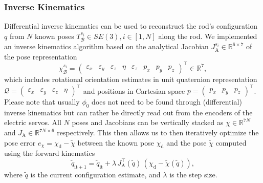 \subsubsection{Inverse Kinematics}\label{ssub:hsamodel:hsa_rod_kinematics:inverse_kinematics}
Differential inverse kinematics can be used to reconstruct the rod's configuration $q$ from $N$ known poses $T_{\mathcal{B}}^{s_i} \in SE(3), i \in [1, N]$ along the rod. 
We implemented an inverse kinematics algorithm based on the analytical Jacobian $J_\mathrm{A}^{s_i} \in \mathbb{R}^{6 \times 7}$ of the pose representation
\begin{equation*}
    \chi_{\mathcal{B}}^{s_i} = \begin{pmatrix}
        \varepsilon_x & \varepsilon_y & \varepsilon_z & \eta & \varepsilon_z & p_x & p_y & p_z
    \end{pmatrix}^\top \in \mathbb{R}^{7},
\end{equation*}
which includes rotational orientation estimates in unit quaternion representation $\mathcal{Q} = \begin{pmatrix} \varepsilon_x & \varepsilon_y & \varepsilon_z & \eta \end{pmatrix}^\top$ and positions in Cartesian space $p = \begin{pmatrix} p_x & p_y & p_z \end{pmatrix}^\top$.
Please note that usually $\phi_0$ does not need to be found through (differential) inverse kinematics but can rather be directly read out from the encoders of the electric servos.
All $N$ poses and Jacobians can be vertically stacked as $\chi \in \mathbb{R}^{7N}$  and $J_\mathrm{A} \in \mathbb{R}^{7N \times 6}$  respectively. This then allows us to then iteratively optimize the pose error $e_\chi = \chi_\mathrm{d} - \tilde{\chi}$ between the known pose $\chi_\mathrm{d}$ and the pose $\tilde{\chi}$ computed using the forward kinematics
\begin{equation}
    \tilde{q}_{\mathrm{it} + 1} = \tilde{q}_{\mathrm{it}} + \lambda \, J_\mathrm{A}^\top(\tilde{q}) \, \left ( \chi_\mathrm{d} - \tilde{\chi}(\tilde{q}) \right ),
\end{equation}
where $\tilde{q}$ is the current configuration estimate, and $\lambda$ is the step size.

